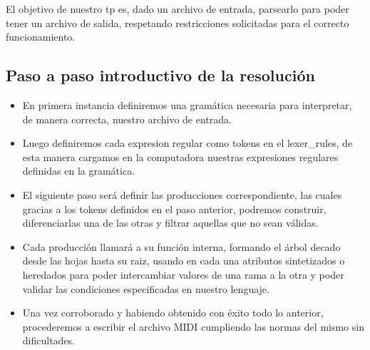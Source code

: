 El objetivo de nuestro tp es, dado un archivo de entrada, parsearlo para poder tener un archivo de salida, respetando restricciones solicitadas para el correcto funcionamiento.

\subsection{Paso a paso introductivo de la resolución}
\begin{itemize}
\item En primera instancia definiremos una gramática necesaria para interpretar, de manera correcta, nuestro archivo de entrada. 
\item Luego definiremos cada expresion regular como tokens en el lexer\_rules, de esta manera cargamos en la computadora nuestras expresiones regulares definidas en la gramática.
\item El siguiente paso será definir las producciones correspondiente, las cuales gracias a los tokens definidos en el paso anterior, podremos construir, diferenciarlas una de las otras y filtrar aquellas que no sean válidas.
\item Cada producción llamará a su función interna, formando el árbol decado desde las hojas hasta su raiz, usando en cada una atributos sintetizados o heredados para poder intercambiar valores de una rama a la otra y poder validar las condiciones especificadas en nuestro lenguaje.
\item Una vez corroborado y habiendo obtenido con éxito todo lo anterior, procederemos a escribir el archivo MIDI cumpliendo las normas del mismo sin dificultades.
\end{itemize}